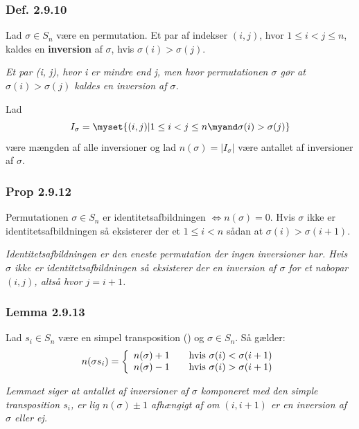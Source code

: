 \subsubsection{Def. 2.9.10}
\label{2.9.10}
Lad $\sigma \in S_n$ være en permutation. Et par af indekser $(i, j)$, hvor $1
\leq i < j \leq n$, kaldes en \textbf{inversion} af $\sigma$, hvis $\sigma(i) >
\sigma(j)$.

\textit{Et par (i, j), hvor i er mindre end j, men hvor permutationen $\sigma$
gør at $\sigma(i) > \sigma(j)$ kaldes en inversion af $\sigma$.}

Lad
\begin{equation*}
  I_\sigma = \myset{(i,j) | 1\leq i < j \leq n \myand \sigma(i) > \sigma(j)}
\end{equation*}
være mængden af alle inversioner og lad $n(\sigma) = |I_\sigma|$ være antallet
af inversioner af $\sigma$.

\subsubsection{Prop 2.9.12}
Permutationen $\sigma \in S_n$ er identitetsafbildningen $\iff n(\sigma) = 0$.
Hvis $\sigma$ ikke er identitetsafbildningen så eksisterer der et $1 \leq i < n$
sådan at $\sigma(i) > \sigma(i + 1)$.

\textit{Identitetsafbildningen er den eneste permutation der ingen inversioner
har. Hvis $\sigma$ ikke er identitetsafbildningen så eksisterer der en
inversion af $\sigma$ for et nabopar $(i, j)$, altså hvor $j = i + 1$.}

\subsubsection{Lemma 2.9.13}
Lad $s_i \in S_n$ være en simpel transposition () og $\sigma
\in S_n$. Så gælder:
\begin{equation*}
n(\sigma s_i) = \left\{
\begin{array}{l l}
n(\sigma) + 1 & \quad \text{hvis $\sigma(i) < \sigma(i + 1)$}\\
n(\sigma) - 1 & \quad \text{hvis $\sigma(i) > \sigma(i + 1)$}\\
\end{array} \right.
\end{equation*}

\textit{Lemmaet siger at antallet af inversioner af $\sigma$ komponeret med den
simple transposition $s_i$, er lig $n(\sigma) \pm 1$ afhængigt af om $(i, i +
1)$ er en inversion af $\sigma$ eller ej.}

